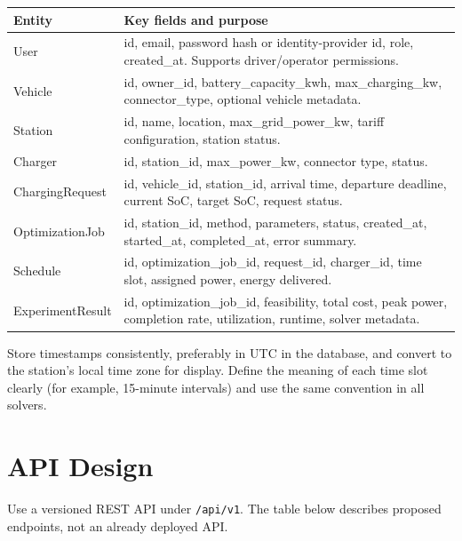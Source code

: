 \documentclass[11pt,a4paper]{article}
\begin{document}
\begin{longtable}{p{3.0cm}p{9.9cm}}
\toprule
\textbf{Entity} & \textbf{Key fields and purpose} \\
\midrule
User & id, email, password hash or identity-provider id, role, created\_at. Supports driver/operator permissions. \\
Vehicle & id, owner\_id, battery\_capacity\_kwh, max\_charging\_kw, connector\_type, optional vehicle metadata. \\
Station & id, name, location, max\_grid\_power\_kw, tariff configuration, station status. \\
Charger & id, station\_id, max\_power\_kw, connector type, status. \\
ChargingRequest & id, vehicle\_id, station\_id, arrival time, departure deadline, current SoC, target SoC, request status. \\
OptimizationJob & id, station\_id, method, parameters, status, created\_at, started\_at, completed\_at, error summary. \\
Schedule & id, optimization\_job\_id, request\_id, charger\_id, time slot, assigned power, energy delivered. \\
ExperimentResult & id, optimization\_job\_id, feasibility, total cost, peak power, completion rate, utilization, runtime, solver metadata. \\
\bottomrule
\end{longtable}

Store timestamps consistently, preferably in UTC in the database, and convert to the station's local time zone for display. Define the meaning of each time slot clearly (for example, 15-minute intervals) and use the same convention in all solvers.

\section{API Design}

Use a versioned REST API under \texttt{/api/v1}. The table below describes proposed endpoints, not an already deployed API.
\end{document}
